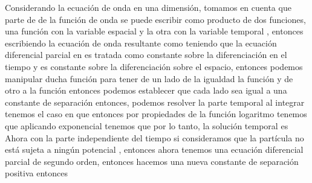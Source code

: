 \begin{enumerate}
  
  Considerando la ecuación de onda en una dimensión, tomamos en cuenta que parte de de la función de onda  se puede escribir como producto de dos funciones, una función con la variable espacial  y la otra con la variable temporal , entonces
    escribiendo la ecuación de onda resultante como
    teniendo que la ecuación diferencial parcial en  es tratada como constante sobre la diferenciación en el tiempo y  es constante sobre la diferenciación sobre el espacio, entonces podemos manipular ducha función para tener de un lado de la igualdad la función \ec{\phi} y de otro a la función 
    entonces podemos establecer que cada lado sea igual a una constante de separación
    entonces, podemos resolver la parte temporal 
    al integrar tenemos el caso en que
    entonces 
      por propiedades de la función logaritmo tenemos que 
  aplicando exponencial tenemos que 
  por lo tanto, la solución temporal es 
Ahora con la parte independiente del tiempo 
si consideramos que la partícula no está sujeta a ningún potencial , entonces
ahora tenemos una ecuación diferencial parcial de segundo orden, entonces hacemos una nueva constante de separación positiva
entonces

















\end{enumerate}
